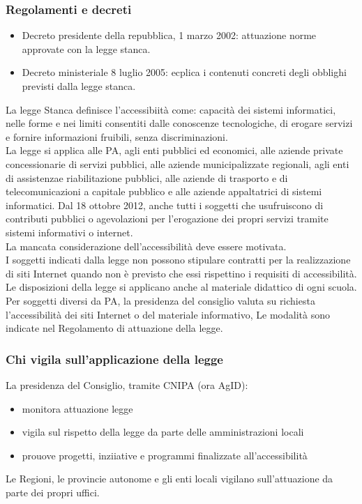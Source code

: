 \documentclass{article}
\begin{document}
\subsubsection{Regolamenti e decreti}
\begin{itemize}
	\item Decreto presidente della repubblica, 1 marzo 2002: attuazione norme approvate con la legge stanca.
	\item Decreto ministeriale 8 luglio 2005: ecplica i contenuti concreti degli obblighi previsti dalla legge stanca.
\end{itemize}
La legge Stanca definisce l'accessibiità come: capacità dei sistemi informatici, nelle forme e nei limiti consentiti dalle conoscenze tecnologiche, di erogare servizi e fornire informazioni fruibili, senza discriminazioni.\\
La legge si applica alle PA, agli enti pubblici ed economici, alle aziende private concessionarie di servizi pubblici, alle aziende municipalizzate regionali, agli enti di assistenzae riabilitazione pubblici, alle aziende di trasporto e di telecomunicazioni a capitale pubblico e alle aziende appaltatrici di sistemi informatici. Dal 18 ottobre 2012, anche tutti i soggetti che usufruiscono di contributi pubblici o agevolazioni per l'erogazione dei propri servizi tramite sistemi informativi o internet.\\
La mancata considerazione dell'accessibilità deve essere motivata.\\
I soggetti indicati dalla legge non possono stipulare contratti per la realizzazione di siti Internet quando non è previsto che essi rispettino i requisiti di accessibilità.\\
Le disposizioni della legge si applicano anche al materiale didattico di ogni scuola.\\
Per soggetti diversi da PA, la presidenza del consiglio valuta su richiesta l'accessibilità dei siti Internet o del materiale informativo, Le modalità sono indicate nel Regolamento di attuazione della legge.
\subsubsection{Chi vigila sull'applicazione della legge}
La presidenza del Consiglio, tramite CNIPA (ora AgID):
\begin{itemize}
\item monitora attuazione legge
\item vigila sul rispetto della legge da parte delle amministrazioni locali
\item prouove progetti, inziiative e programmi finalizzate all'accessibilità
\end{itemize}
Le Regioni, le provincie autonome e gli enti locali vigilano sull'attuazione da parte dei propri uffici.
\end{document}
